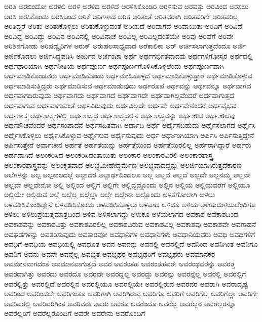 {ಅರತಿ
ಅರಬಿಂದೋ
ಅರಳಲಿ
ಅರಳಿ
ಅರಳಿದ
ಅರಳಿದೆ
ಅರಳಿಸಿಕೊಂಡಿರಿ
ಅರಳಿಸುವ
ಅರವತ್ತು
ಅರವಿಂದ
ಅರಸಲು
ಅರಸಿ
ಅರಸಿಕೊಂಡು
ಅರಸಿಬಂದ
ಅರಿಕೆ
ಅರಿಗಳಾದ
ಅರಿತ
ಅರಿತಂತೆ
ಅರಿತವರಾಗಿ
ಅರಿತವರಿಗೇ
ಅರಿತವರಿಲ್ಲ
ಅರಿತಿದ್ದರೆ
ಅರಿತು
ಅರಿತುಕೊಳ್ಳಲು
ಅರಿತುಕೊಳ್ಳುವಂತೆ
ಅರಿಯದೆ
ಅರಿವಾಗದೆ
ಅರಿವಾಯಿತು
ಅರಿವಿಗೆ
ಅರಿವಿದೆ
ಅರಿವಿದ್ದ
ಅರಿವಿದ್ದು
ಅರಿವಿನ
ಅರಿವಿನಲ್ಲಿ
ಅರಿವಿನಾಚೆ
ಅರಿವಿಲ್ಲ
ಅರಿವಿಲ್ಲದಂತೆಯೇ
ಅರಿವು
ಅರಿವೆಗೆ
ಅರಿವೇ
ಅರಿಶಿನಗೋಡು
ಅರಿಷಡ್ವೈರಿಗಳ
ಅರುಕ್
ಅರುಹಲಸಾಧ್ಯವಾದ
ಅರೆಕಾಲಿಕಾ
ಅರ್
ಅರ್ಚಿಸಲಾಗುತ್ತದೆಂದೂ
ಅರ್ಜಿ
ಅರ್ಜಿಕೊಡಲು
ಅರ್ಜಿಸಿದ್ಧಪಡಿಸಿ
ಅರ್ಜುನ
ಅರ್ಜೆಂಟಾ
ಅರ್ಥ
ಅರ್ಥಗರ್ಭಿತವಾದವು
ಅರ್ಥಗಳಿಗೋಸ್ಕರ
ಅರ್ಥದಲ್ಲಿ
ಅರ್ಥಧಾರಿಯಾಗಿ
ಅರ್ಥನೀತಿಯ
ಅರ್ಥಪೂರ್ಣ
ಅರ್ಥಪೂರ್ಣಗೊಳಿಸಿಕೊಳ್ಳಲೆಂದು
ಅರ್ಥಪೂರ್ಣವಾಗಿ
ಅರ್ಥಮಾಡಿಕೊಂಡವರು
ಅರ್ಥಮಾಡಿಕೊಂಡು
ಅರ್ಥಮಾಡಿಕೊಳ್ಳದ
ಅರ್ಥಮಾಡಿಕೊಳ್ಳುತ್ತಾರೆ
ಅರ್ಥಮಾಡಿಕೊಳ್ಳುವ
ಅರ್ಥಮಾಡಿಸುತ್ತಿದ್ದರು
ಅರ್ಥಮಾಡಿಸುವ
ಅರ್ಥಮಾಡುವುದು
ಅರ್ಥರೂಪ
ಅರ್ಥವನ್ನು
ಅರ್ಥವನ್ನೂ
ಅರ್ಥವಾಗದ
ಅರ್ಥವಾಗದಿರುವುದು
ಅರ್ಥವಾಗದು
ಅರ್ಥವಾಗದೆ
ಅರ್ಥವಾಗದೇ
ಅರ್ಥವಾಗಿಲ್ಲವೆಂದರೆ
ಅರ್ಥವಾಗುತ್ತದೆ
ಅರ್ಥವಾಗುವ
ಅರ್ಥವಾಗುವಂತೆ
ಅರ್ಥವಿರುವುದು
ಅರ್ಥವಿಲ್ಲದೇ
ಅರ್ಥವೇ
ಅರ್ಥವೇನೆಂದರೆ
ಅರ್ಥವೈಭವ
ಅರ್ಥಶಾಸ್ತ್ರ
ಅರ್ಥಶಾಸ್ತ್ರಗಳಲ್ಲಿ
ಅರ್ಥಶಾಸ್ತ್ರದ
ಅರ್ಥಶಾಸ್ತ್ರದಲ್ಲಿನ
ಅರ್ಥಶಾಸ್ತ್ರವನ್ನು
ಅರ್ಥಶೌಚ
ಅರ್ಥಶೌಚವು
ಅರ್ಥಶೌಚವೆಂದರೆ
ಅರ್ಥಸಂಪಾದನೆ
ಅರ್ಥಸಹಿತವಾಗಿ
ಅರ್ಥಾದಿ
ಅರ್ಥೆ
ಅರ್ಥೈಸಬಹುದು
ಅರ್ಥೈಸಲಾಗದ
ಅರ್ಥೈಸಿ
ಅರ್ಥೈಸಿಕೊಳ್ಳಲು
ಅರ್ಥೈಸಿಕೊಳ್ಳುವ
ಅರ್ಥೈಸುವ
ಅರ್ಥೈಸುವುದು
ಅರ್ಧ
ಅರ್ಧಾಂಗಿಯಾಗಿ
ಅರ್ಪಿಸಿ
ಅರ್ಪಿಸುತ್ತಿದ್ದೇನೆ
ಅರ್ಪಿಸುತ್ತೇನೆ
ಅರ್ವಾಚೀನ
ಅರ್ಹತೆ
ಅರ್ಹತೆಯನ್ನು
ಅರ್ಹತೆಯಿಂದ
ಅರ್ಹತೆಯಿರಲಿಲ್ಲ
ಅರ್ಹರಾಗಿದ್ದಾರೆ
ಅರ್ಹರು
ಅರ್ಹವಾಗಿದೆ
ಅಲಂಕರಿಸಿದ
ಅಲಂಕರಿಸಿದಂತಾಯಿತು
ಅಲಂಕಾರ
ಅಲಂಕಾರವಿರಲಿ
ಅಲಂಕಾರಶಾಸ್ತ್ರ
ಅಲಂಕಾರಶಾಸ್ತ್ರವನ್ನು
ಅಲಂಕೃತವಾದ
ಅಲಭ್ಧಮೀಹೇದ್ಧರ್ಮೆಣ
ಅಲಭ್ಧವಾದದ್ದನ್ನು
ಅಲರ್ಜಿಯಾಗಿರುತ್ತದೆಕಾರಣ
ಅಲೆಗಳನ್ನು
ಅಲ್ಪ
ಅಲ್ಪಕಾಲದಲ್ಲೆ
ಅಲ್ಪಾದರ
ಅಲ್ಪಾರ್ಥದಿಂದಲೂ
ಅಲ್ಲ
ಅಲ್ಲದ
ಅಲ್ಲದೆ
ಅಲ್ಲದೇ
ಅಲ್ಲನಮ್ಮ
ಅಲ್ಲವೇ
ಅಲ್ಲವೇ
ಅಲ್ಲವೇನೋ
ಅಲ್ಲಿ
ಅಲ್ಲಿಂದ
ಅಲ್ಲಿಗೆ
ಅಲ್ಲಿಗೇ
ಅಲ್ಲಿದ್ದದ್ದೊಂದು
ಅಲ್ಲಿನ
ಅಲ್ಲಿಯ
ಅಲ್ಲಿಯವರೆಗೆ
ಅಲ್ಲಿಯೂ
ಅಲ್ಲಿಯೇ
ಅಲ್ಲಿರುವ
ಅಲ್ಲೆ
ಅಲ್ಲೆಲ್ಲ
ಅಲ್ಲೆಲ್ಲಾ
ಅಲ್ಲೇ
ಅಲ್ಲೇನಾ
ಅಲ್ಲೊಂದು
ಅಳತೆಗೋಲಾಗಿ
ಅಳಲು
ಅಳವಡಿಸಿಕೊಂಡಿದ್ದೇನೆ
ಅಳವಡಿಸಿಕೊಂಡು
ಅಳವಡಿಸಿಕೊಳ್ಳಲು
ಅಳವಾದ
ಅಳಿದೂ
ಅಳಿಯ
ಅಳಿಯದುಳಿಯಲೆಂದಿಗೂ
ಅಳಿಲು
ಅಳಿಲುಪ್ರಯತ್ನಮಾತ್ರದಿಂದ
ಅಳಿವ
ಅಳಿಸಲಾಗದ್ದು
ಅಳುಕೂ
ಅಳೆಯಲಾಗದ
ಅವಕಾಶ
ಅವಕಾಶದಿಂದ
ಅವಕಾಶವನ್ನು
ಅವಕಾಶವಿತ್ತು
ಅವಕಾಶವಿರಲಿಲ್ಲ
ಅವಕಾಶವಿರುವ
ಅವಕಾಶವಿಲ್ಲ
ಅವಕಾಶವು
ಅವಕಾಶವೇ
ಅವಗಾಹನೆ
ಅವಘಡಗಳನ್ನು
ಅವತರಿಸುವುದು
ಅವತಾರವೋ
ಅವಧಾನಿಗಳ
ಅವಧಾನಿಗಳು
ಅವಧಾನಿಯವರು
ಅವಧಿ
ಅವಧಿಗಳಿಗೆ
ಅವಧಿಗೆ
ಅವಧಿಯ
ಅವಧಿಯಲ್ಲಿ
ಅವಧೂತ
ಅವನ
ಅವನನ್ನು
ಅವನಲ್ಲಿ
ಅವನಲ್ಲಿದೆ
ಅವನಿಂದ
ಅವನಿಗಿಂತ
ಅವನಿಗೂ
ಅವನಿಗೆ
ಅವನು
ಅವನೇ
ಅವನ್ನೆಲ್ಲ
ಅವಭೃತ
ಅವಭೃಥರ
ಅವಭೃಥರಿಗೆ
ಅವಭೃಥರು
ಅವಮಾನಕರ
ಅವಮಾನವಾಗದಂತೆ
ಅವಮಾನವಾಗುತ್ತದೆ
ಅವರ
ಅವರಂತಹ
ಅವರಂತಹವರೇ
ಅವರಂಥವರನ್ನು
ಅವರತ್ತ
ಅವರದಾಗಿತ್ತು
ಅವರದು
ಅವರದೂ
ಅವರದೇ
ಅವರದ್ದಲ್ಲ
ಅವರದ್ದು
ಅವರನ್ನು
ಅವರನ್ನೆಲ್ಲ
ಅವರಲ್ಲಿ
ಅವರಲ್ಲಿಗೆ
ಅವರಲ್ಲಿತ್ತು
ಅವರಲ್ಲಿದೆ
ಅವರಲ್ಲಿನ
ಅವರಲ್ಲಿಯೂ
ಅವರಲ್ಲಿಯೇ
ಅವರಲ್ಲಿರುವ
ಅವರವರ
ಅವರಾಗಿ
ಅವರಾದೃಷ್ಟ
ಅವರಿಂದ
ಅವರಿಂದಲೇ
ಅವರಿಗಂತೂ
ಅವರಿಗಾಗಿ
ಅವರಿಗಿರುವ
ಅವರಿಗೂ
ಅವರಿಗೆ
ಅವರಿಗೆಲ್ಲ
ಅವರಿಗೆಲ್ಲಾ
ಅವರಿಗೇ
ಅವರಿವರಲ್ಲಿ
ಅವರಿವರಿಗಿಂತ
ಅವರಿವರು
ಅವರು
ಅವರೂ
ಅವರೆಂದೂ
ಅವರೆಲ್ಲ
ಅವರೆಲ್ಲರ
ಅವರೆಲ್ಲರನ್ನೂ
ಅವರೆಲ್ಲರಿಗೆ
ಅವರೆಲ್ಲರೊಂದಿಗೆ
ಅವರೇ
ಅವರೇನು
ಅವರೊಂದಿಗೆ
}
